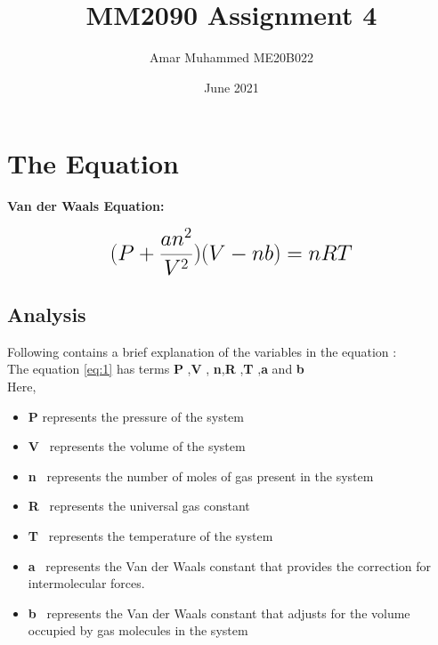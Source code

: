 \documentclass[a4paper, 11pt]{article}
\begin{document}
\title{MM2090 Assignment 4}
\author{Amar Muhammed ME20B022}
\date{June 2021}
\maketitle

\section{The Equation}

\textbf{Van der Waals Equation:}  

\begin{equation}
 {\LARGE{\textbf{$(P + \frac{an^2}{V^2})(V-nb) = nRT$}}}
 \label{eq:1}
\end{equation}


\subsection{Analysis}
Following contains a brief explanation of the variables in the equation : \\
\normalsize{The equation \ref{eq:1}  has terms \textbf{P} ,\textbf{V} , \textbf{n},\textbf{R} ,\textbf{T} ,\textbf{a} and \textbf{b}}\\
{\normalsize {Here,}}\\
\begin{itemize}
\item{\normalsize {\textbf{P} represents the pressure of the system  }}\\
\item{\normalsize {\textbf{V} \  represents the volume of the system}}\\
\item{\normalsize {\textbf{n} \  represents the number of moles of gas present in the system}}\\
\item{\normalsize {\textbf{R} \  represents the universal gas constant}}\\
\item{\normalsize{\textbf{T} \ represents the temperature of the system}}\\
\item{\normalsize{\textbf{a} \ represents the Van der Waals constant that provides the correction for intermolecular forces.}}\\
\item{\normalsize{\textbf{b} \ represents the Van der Waals constant that adjusts for the volume occupied by gas molecules in the system}}
\end{itemize}
\end{document}
